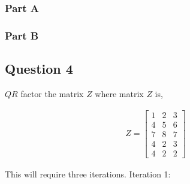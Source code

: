 \subsubsection{Part A}
\subsubsection{Part B}

\newpage
\subsection{Question 4}

\(QR\) factor the matrix \(Z\) where matrix \(Z\) is,

\begin{eqnarray}
  Z = 
  \begin{bmatrix}
    1 & 2 & 3 \\
    4 & 5 & 6 \\
    7 & 8 & 7 \\
    4 & 2 & 3 \\
    4 & 2 & 2
  \end{bmatrix}
\end{eqnarray}
  
This will require three iterations.
Iteration 1:

